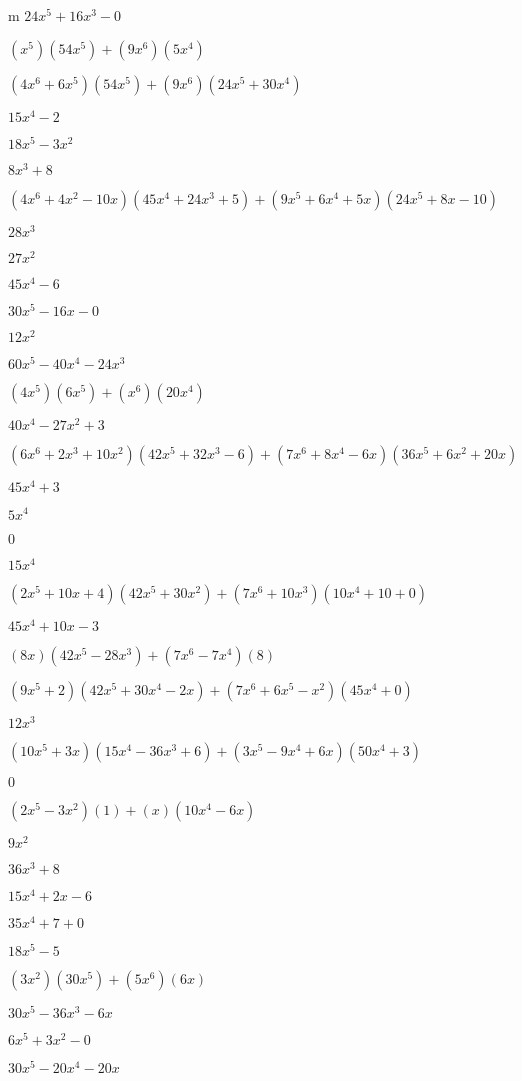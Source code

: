 \documentclass{article}
\begin{document}
\begin{multicols}{2}
m $24x^{5}+16x^{3}-0$\item $(x^{5})(54x^{5})+(9x^{6})(5x^{4})$\item $(4x^{6}+6x^{5})(54x^{5})+(9x^{6})(24x^{5}+30x^{4})$\item $15x^{4}-2$\item $18x^{5}-3x^{2}$\item $8x^{3}+8$\item $(4x^{6}+4x^2-10x)(45x^{4}+24x^{3}+5)+(9x^{5}+6x^{4}+5x)(24x^{5}+8x-10)$\item $28x^{3}$\item $27x^{2}$\item $45x^{4}-6$\item $30x^{5}-16x-0$\item $12x^{2}$\item $60x^{5}-40x^{4}-24x^{3}$\item $(4x^{5})(6x^{5})+(x^{6})(20x^{4})$\item $40x^{4}-27x^{2}+3$\item $(6x^{6}+2x^{3}+10x^2)(42x^{5}+32x^{3}-6)+(7x^{6}+8x^{4}-6x)(36x^{5}+6x^{2}+20x)$\item $45x^{4}+3$\item $5x^{4}$\item $0$\item $15x^{4}$\item $(2x^{5}+10x+4)(42x^{5}+30x^{2})+(7x^{6}+10x^{3})(10x^{4}+10+0)$\item $45x^{4}+10x-3$\item $(8x)(42x^{5}-28x^{3})+(7x^{6}-7x^{4})(8)$\item $(9x^{5}+2)(42x^{5}+30x^{4}-2x)+(7x^{6}+6x^{5}-x^2)(45x^{4}+0)$\item $12x^{3}$\item $(10x^{5}+3x)(15x^{4}-36x^{3}+6)+(3x^{5}-9x^{4}+6x)(50x^{4}+3)$\item $0$\item $(2x^{5}-3x^2)(1)+(x)(10x^{4}-6x)$\item $9x^{2}$\item $36x^{3}+8$\item $15x^{4}+2x-6$\item $35x^{4}+7+0$\item $18x^{5}-5$\item $(3x^2)(30x^{5})+(5x^{6})(6x)$\item $30x^{5}-36x^{3}-6x$\item $6x^{5}+3x^{2}-0$\item $30x^{5}-20x^{4}-20x$\item 
\end{multicols}
\end{document}
